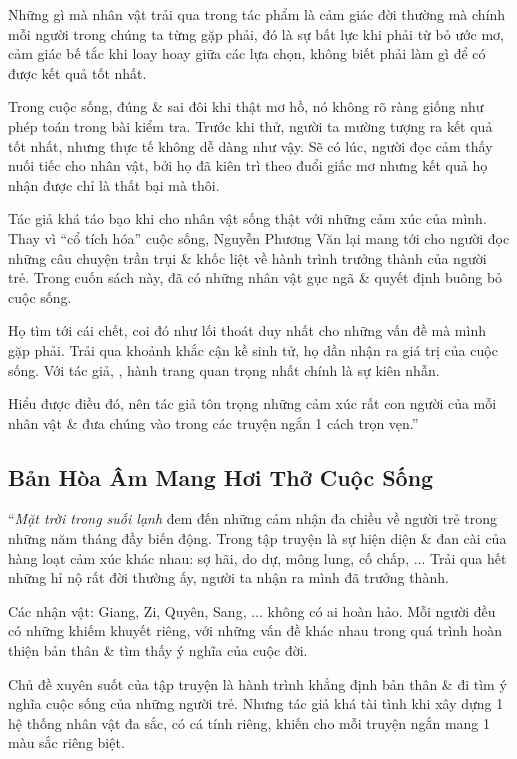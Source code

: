 \documentclass[oneside]{book}
\numberwithin{equation}{section}
\begin{document}
Những gì mà nhân vật trải qua trong tác phẩm là cảm giác đời thường mà chính mỗi người trong chúng ta từng gặp phải, đó là sự bất lực khi phải từ bỏ ước mơ, cảm giác bế tắc khi loay hoay giữa các lựa chọn, không biết phải làm gì để có được kết quả tốt nhất.

Trong cuộc sống, đúng \& sai đôi khi thật mơ hồ, nó không rõ ràng giống như phép toán trong bài kiểm tra. Trước khi thử, người ta mường tượng ra kết quả tốt nhất, nhưng thực tế không dễ dàng như vậy. Sẽ có lúc, người đọc cảm thấy nuối tiếc cho nhân vật, bởi họ đã kiên trì theo đuổi giấc mơ nhưng kết quả họ nhận được chỉ là thất bại mà thôi.

Tác giả khá táo bạo khi cho nhân vật sống thật với những cảm xúc của mình. Thay vì ``cổ tích hóa'' cuộc sống, Nguyễn Phương Văn lại mang tới cho người đọc những câu chuyện trần trụi \& khốc liệt về hành trình trưởng thành của người trẻ. Trong cuốn sách này, đã có những nhân vật gục ngã \& quyết định buông bỏ cuộc sống.

Họ tìm tới cái chết, coi đó như lối thoát duy nhất cho những vấn đề mà mình gặp phải. Trải qua khoảnh khắc cận kề sinh tử, họ dần nhận ra giá trị của cuộc sống. Với tác giả, , hành trang quan trọng nhất chính là sự kiên nhẫn.

 Hiểu được điều đó, nên tác giả tôn trọng những cảm xúc rất con người của mỗi nhân vật \& đưa chúng vào trong các truyện ngắn 1 cách trọn vẹn.''

\subsection{Bản Hòa Âm Mang Hơi Thở Cuộc Sống}
``\textit{Mặt trời trong suối lạnh} đem đến những cảm nhận đa chiều về người trẻ trong những năm tháng đầy biến động. Trong tập truyện là sự hiện diện \& đan cài của hàng loạt cảm xúc khác nhau: sợ hãi, do dự, mông lung, cố chấp, $\ldots$ Trải qua hết những hỉ nộ rất đời thường ấy, người ta nhận ra mình đã trưởng thành.

Các nhận vật: Giang, Zi, Quyên, Sang, $\ldots$ không có ai hoàn hảo. Mỗi người đều có những khiếm khuyết riêng, với những vấn đề khác nhau trong quá trình hoàn thiện bản thân \& tìm thấy ý nghĩa của cuộc đời.

Chủ đề xuyên suốt của tập truyện là hành trình khẳng định bản thân \& đi tìm ý nghĩa cuộc sống của những người trẻ. Nhưng tác giả khá tài tình khi xây dựng 1 hệ thống nhân vật đa sắc, có cá tính riêng, khiến cho mỗi truyện ngắn mang 1 màu sắc riêng biệt.
\end{document}
